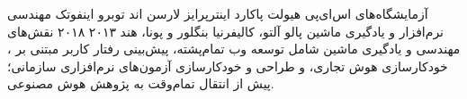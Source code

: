 \begin{cventries}
\cventry
{آزمایشگاه‌های اس‌ای‌پی  هیولت پاکارد اینترپرایز  لارسن اند توبرو اینفوتک}
{مهندسی نرم‌افزار و یادگیری ماشین}
{پالو آلتو، کالیفرنیا \lr{/} بنگلور و پونا، هند}
{۲۰۱۳  ۲۰۱۸}
{نقش‌های مهندسی و یادگیری ماشین شامل توسعه وب تمام‌پشته، پیش‌بینی رفتار کاربر مبتنی بر ، خودکارسازی هوش تجاری، و طراحی و خودکارسازی آزمون‌های نرم‌افزاری سازمانی؛ پیش از انتقال تمام‌وقت به پژوهش هوش مصنوعی.}

\end{cventries}

